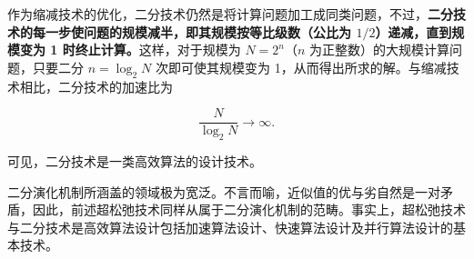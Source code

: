 \documentclass[
  10pt,
  fontset=fandol]{ctexart}
\begin{document}
作为缩减技术的优化，二分技术仍然是将计算问题加工成同类问题，不过，\textbf{二分技术的每一步使问题的规模减半，即其规模按等比级数（公比为 \(1/2\)）递减，直到规模变为 1 时终止计算。}这样，对于规模为 \(N=2^n\)（\(n\) 为正整数）的大规模计算问题，只要二分 \(n=\log_2N\) 次即可使其规模变为 1，从而得出所求的解。与缩减技术相比，二分技术的加速比为

\[
\frac{N}{\log_2N}\longrightarrow\infty.
\]

可见，二分技术是一类高效算法的设计技术。

二分演化机制所涵盖的领域极为宽泛。不言而喻，近似值的优与劣自然是一对矛盾，因此，前述超松弛技术同样从属于二分演化机制的范畴。事实上，超松弛技术与二分技术是高效算法设计包括加速算法设计、快速算法设计及并行算法设计的基本技术。
\end{document}
